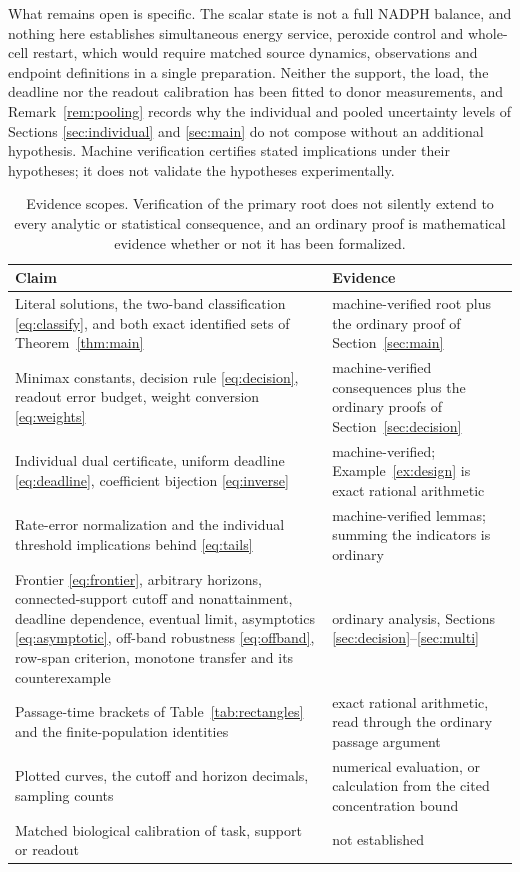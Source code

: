 \documentclass[11pt]{article}
\theoremstyle{definition}
\begin{document}
What remains open is specific. The scalar state is not a full NADPH balance,
and nothing here establishes simultaneous energy service, peroxide control and
whole-cell restart, which would require matched source dynamics, observations
and endpoint definitions in a single preparation. Neither the support, the
load, the deadline nor the readout calibration has been fitted to donor
measurements, and Remark~\ref{rem:pooling} records why the individual and
pooled uncertainty levels of Sections \ref{sec:individual} and \ref{sec:main}
do not compose without an additional hypothesis. Machine verification
certifies stated implications under their hypotheses; it does not validate the
hypotheses experimentally.

\begin{table}[ht]
\centering\small
\begin{tabularx}{\linewidth}{@{}>{\raggedright\arraybackslash}p{.45\linewidth}>{\raggedright\arraybackslash}X@{}}
\toprule
Claim & Evidence\\
\midrule
Literal solutions, the two-band classification \eqref{eq:classify}, and both
exact identified sets of Theorem~\ref{thm:main}
& machine-verified root plus the ordinary proof of
Section~\ref{sec:main}\\
Minimax constants, decision rule \eqref{eq:decision}, readout error budget,
weight conversion \eqref{eq:weights}
& machine-verified consequences plus the ordinary proofs of
Section~\ref{sec:decision}\\
Individual dual certificate, uniform deadline
\eqref{eq:deadline}, coefficient bijection \eqref{eq:inverse}
& machine-verified; Example~\ref{ex:design} is exact rational arithmetic\\
Rate-error normalization and the individual threshold implications behind
\eqref{eq:tails}
& machine-verified lemmas; summing the indicators is ordinary\\
Frontier \eqref{eq:frontier}, arbitrary horizons, connected-support cutoff and
nonattainment, deadline dependence, eventual limit, asymptotics
\eqref{eq:asymptotic}, off-band robustness \eqref{eq:offband}, row-span
criterion, monotone transfer and its counterexample
& ordinary analysis, Sections
\ref{sec:decision}--\ref{sec:multi}\\
Passage-time brackets of Table~\ref{tab:rectangles} and the finite-population
identities
& exact rational arithmetic, read through the ordinary passage
argument\\
Plotted curves, the cutoff and horizon decimals, sampling counts
& numerical evaluation, or calculation from the cited concentration bound\\
Matched biological calibration of task, support or readout & not established\\
\bottomrule
\end{tabularx}
\caption{Evidence scopes. Verification of the primary root does not silently
extend to every analytic or statistical consequence, and an ordinary proof is
mathematical evidence whether or not it has been
formalized.}\label{tab:evidence}
\end{table}
\end{document}
